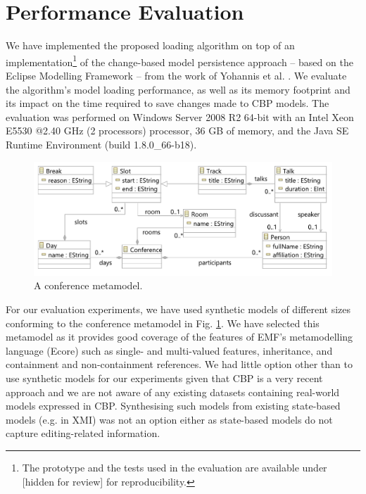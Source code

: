 \documentclass{llncs}
\begin{document}
\section{Performance Evaluation}
\label{sec:performance_evaluation}
We have implemented the proposed loading algorithm on top of an implementation\footnote{The prototype and the tests used in the evaluation are available under [hidden for review] for reproducibility. %
} of the change-based model persistence approach -- based on the Eclipse Modelling Framework -- from the work of Yohannis et al. \cite{yohannis2017turning}. We evaluate the algorithm's model loading  performance, as well as its memory footprint and its impact on the time required to save changes made to CBP models. The evaluation was performed on Windows Server 2008 R2 64-bit with an Intel Xeon E5530 @2.40 GHz (2 processors) processor, 36 GB of memory, and the Java SE Runtime Environment (build 1.8.0\_66-b18).

\begin{figure}[htbp]
    \centering
    \includegraphics[width=0.9\linewidth]{conference_metamodel}
    \caption{A conference metamodel.}   
    \label{fig:node_metamodel}
\end{figure}

For our evaluation experiments, we have used synthetic models of different sizes conforming to the conference metamodel in Fig. \ref{fig:node_metamodel}. We have selected this metamodel as it provides good coverage of the features of EMF's metamodelling language (Ecore) such as single- and multi-valued features, inheritance, and containment and non-containment references. We had little option other than to use synthetic models for our experiments given that CBP is a very recent approach and we are not aware of any existing datasets containing real-world models expressed in CBP. Synthesising such models from existing state-based models (e.g. in XMI) was not an option either as state-based models do not capture editing-related information.    
\end{document}
